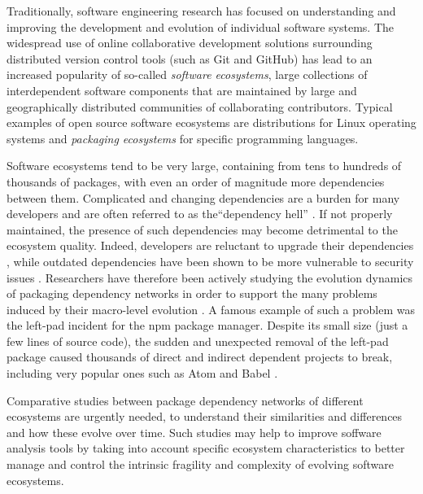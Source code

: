 \documentclass[smallextended]{svjour3}       %
\newcommand{\github}{\textsf{GitHub}\xspace}
\newcommand{\git}{\textsf{Git}\xspace}
\begin{document}
Traditionally, software engineering research has focused on understanding and improving the development and evolution of individual software systems. The widespread use of online collaborative development solutions surrounding distributed version control tools (such as \git and \github) has lead to an increased popularity of so-called \emph{software ecosystems}, large collections of interdependent software components that are maintained by large and geographically distributed communities of collaborating contributors. Typical examples of open source software ecosystems are distributions for Linux operating systems and \emph{packaging ecosystems} for specific programming languages. 

Software ecosystems tend to be very large, containing from tens to hundreds of thousands of packages, with even an order of magnitude more dependencies between them.
Complicated and changing dependencies are a burden for many developers and are often referred to as the``dependency hell'' \cite{Artho2012, Bogart2016}. 
If not properly maintained, the presence of such dependencies may become detrimental to the ecosystem quality. Indeed, developers are reluctant to upgrade their dependencies \cite{Bavota2015}, while outdated dependencies have been shown to be more vulnerable to security issues \cite{Cox2015}. 
Researchers have therefore been actively studying the evolution dynamics of packaging dependency networks in order to support the many problems induced by their macro-level evolution \cite{Decan2016SANER,Gonzalez-Barahona2009}.
A famous example of such a problem was the \textsf{left-pad} incident for the \textsf{npm} package manager.
Despite its small size (just a few lines of source code), the sudden and unexpected removal of the \textsf{left-pad} package
caused thousands of direct and indirect dependent projects to break, including very popular ones such as \textsf{Atom} and \textsf{Babel} \cite{NPM2016,Haney2016}.

Comparative studies between package dependency networks of different ecosystems are urgently needed, to understand their similarities and differences and how these evolve over time. Such studies may help to improve soffware analysis tools by taking into account specific ecosystem characteristics to better manage and control the intrinsic fragility and complexity of evolving software ecosystems.
\end{document}
